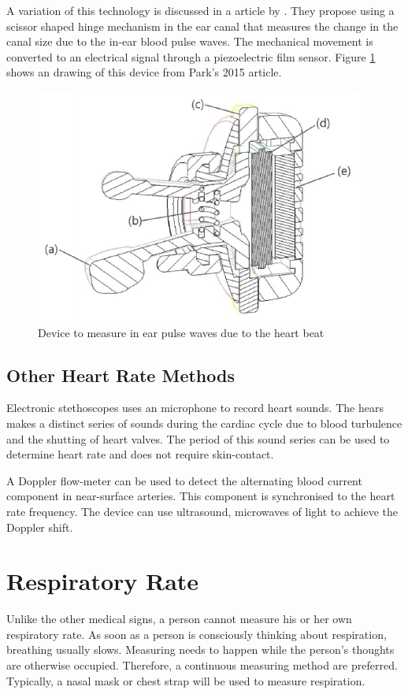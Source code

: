 \medskip
A variation of this technology is discussed in a article by \cite{park2015wearable}. They propose using a scissor shaped hinge mechanism in the ear canal that measures the change in the canal size due to the in-ear blood pulse waves. The mechanical movement is converted to an electrical signal through a piezoelectric film sensor. Figure \ref{fig:BCGsensor} shows an drawing of this device from Park's 2015 article.

\begin{figure}[h]
   \centering
   \includegraphics[scale=0.8]{figs/BCGsensor}
   \caption{Device to measure in ear pulse waves due to the heart beat \citep{park2015wearable}}
   \label{fig:BCGsensor}
\end{figure}

\subsection{Other Heart Rate Methods}
Electronic stethoscopes uses an microphone to record heart sounds. The hears makes a distinct series of sounds during the cardiac cycle due to blood turbulence and the shutting of heart valves. The period of this sound series can be used to determine heart rate and does not require skin-contact.

\medskip
A Doppler flow-meter can be used to detect the alternating blood current component in near-surface arteries. This component is synchronised to the heart rate frequency. The device can use ultrasound, microwaves of light to achieve the Doppler shift.

\section{Respiratory Rate}
Unlike the other medical signs, a person cannot measure his or her own respiratory rate. As soon as a person is consciously thinking about respiration, breathing usually slows. Measuring needs to happen while the person's thoughts are otherwise occupied. Therefore, a continuous measuring method are preferred. Typically, a nasal mask or chest strap will be used to measure respiration. 

